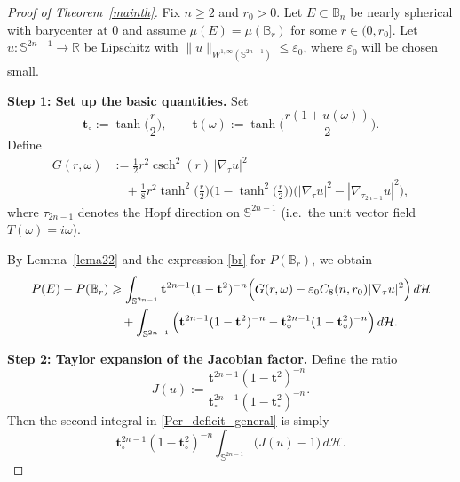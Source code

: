 \documentclass[11pt]{amsart}
\newcommand{\csch}{\operatorname{csch}}
\numberwithin{equation}{section}
\def\ge{\geqslant}
\begin{document}
\begin{proof}[Proof of Theorem~\ref{mainth}]
Fix $n\ge 2$ and $r_0>0$. Let $E\subset\mathbb B_n$ be nearly spherical with barycenter at $0$
and assume $\mu(E)=\mu(\mathbb B_r)$ for some $r\in(0,r_0]$.
Let $u:\mathbb S^{2n-1}\to\mathbb R$ be Lipschitz with
$\|u\|_{W^{1,\infty}(\mathbb S^{2n-1})}\le \varepsilon_0$, where $\varepsilon_0$ will be chosen small.

\medskip

\noindent\textbf{Step 1: Set up the basic quantities.}
Set
\[
\mathbf t_\circ := \tanh\Big(\frac r2\Big),
\qquad
\mathbf t(\omega) := \tanh\Big(\frac{r(1+u(\omega))}{2}\Big).
\]
Define
\begin{equation}\label{G_general}
\begin{split}
G(r,\omega)
&:=\frac12 r^2\csch^2(r)\,|\nabla_\tau u|^2\\
&\quad+\frac18 r^2\tanh^2\!\Big(\frac r2\Big)\Big(1-\tanh^2\!\Big(\frac r2\Big)\Big)
\Big(|\nabla_\tau u|^2-|\nabla_{\tau_{2n-1}}u|^2\Big),
\end{split}
\end{equation}
where $\tau_{2n-1}$ denotes the Hopf direction on $\mathbb S^{2n-1}$ (i.e.\ the unit vector field
$T(\omega)= i\omega$).

By Lemma~\ref{lema22} and the expression \eqref{br} for $P(\mathbb B_r)$, we obtain
\begin{align}
P(E)-P(\mathbb B_r)
&\ge
\int_{\mathbb S^{2n-1}}\mathbf t^{2n-1}(1-\mathbf t^2)^{-n}
\Big(G(r,\omega)-\varepsilon_0 C_8(n,r_0)|\nabla_\tau u|^2\Big)\,d\mathcal H
\notag\\
&\quad+
\int_{\mathbb S^{2n-1}}
\Big(\mathbf t^{2n-1}(1-\mathbf t^2)^{-n}-\mathbf t_\circ^{2n-1}(1-\mathbf t_\circ^2)^{-n}\Big)\,d\mathcal H.
\label{Per_deficit_general}
\end{align}

\medskip

\noindent\textbf{Step 2: Taylor expansion of the Jacobian factor.}
Define the ratio
\[
J(u):=\frac{\mathbf t^{2n-1}(1-\mathbf t^2)^{-n}}{\mathbf t_\circ^{2n-1}(1-\mathbf t_\circ^2)^{-n}}.
\]
Then the second integral in \eqref{Per_deficit_general} is simply
\[
\mathbf t_\circ^{2n-1}(1-\mathbf t_\circ^2)^{-n}\int_{\mathbb S^{2n-1}}\big(J(u)-1\big)\,d\mathcal H.
\]

\smallskip


\end{proof}
\end{document}
